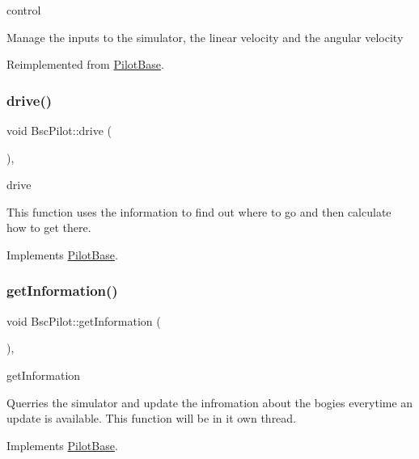 control 

Manage the inputs to the simulator, the linear velocity and the angular velocity 

Reimplemented from \hyperlink{classPilotBase_a611edd0c1a501e1bb6722f5b62e95d6b}{Pilot\+Base}.

\mbox{\label{classBscPilot_af73cc7f821a08574eae05be8c5806646}} 
\subsubsection{\texorpdfstring{drive()}{drive()}}
{\footnotesize\ttfamily void Bsc\+Pilot\+::drive (\begin{DoxyParamCaption}{ }\end{DoxyParamCaption})\hspace{0.3cm}{\ttfamily [protected]}, {\ttfamily [virtual]}}



drive 

This function uses the information to find out where to go and then calculate how to get there. 

Implements \hyperlink{classPilotBase_ad4a3db2cf9d40b5936dba864977eee95}{Pilot\+Base}.

\mbox{\label{classBscPilot_aa40dc622dc2c856c0a8b2e8c61970f00}} 
\subsubsection{\texorpdfstring{get\+Information()}{getInformation()}}
{\footnotesize\ttfamily void Bsc\+Pilot\+::get\+Information (\begin{DoxyParamCaption}{ }\end{DoxyParamCaption})\hspace{0.3cm}{\ttfamily [protected]}, {\ttfamily [virtual]}}



get\+Information 

Querries the simulator and update the infromation about the bogies everytime an update is available. This function will be in it own thread. 

Implements \hyperlink{classPilotBase_a0c3cfd1b468842734e3706ff8dea133b}{Pilot\+Base}.

